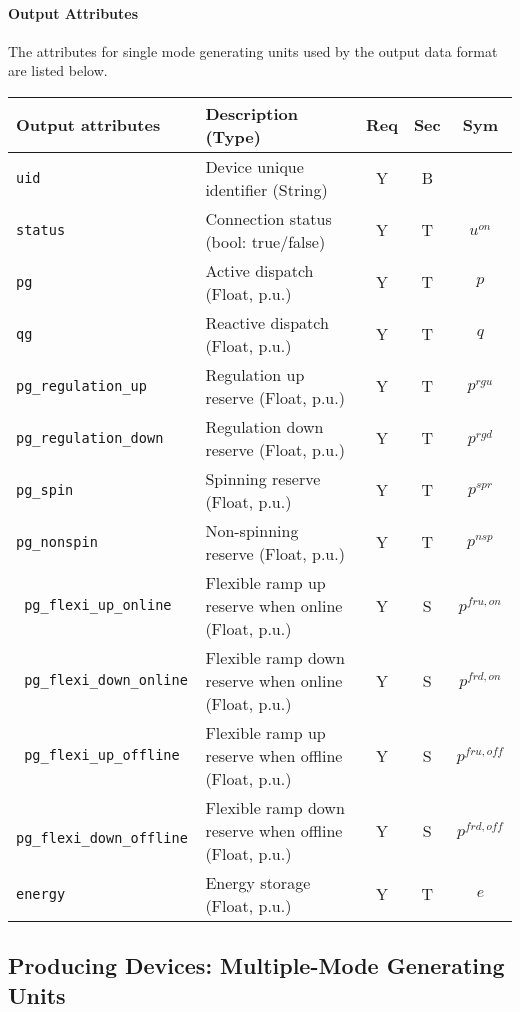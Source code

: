 \documentclass{article}
\begin{document}
\paragraph{Output Attributes} The attributes for single mode generating units used by the output data format are listed below.
\begin{center}
\small
\begin{tabular}{ l | l | c | c | c |}
Output attributes & Description (Type) & Req & Sec & Sym\\
\hline
  {\tt uid} & Device unique identifier (String) & Y & B & \\
  {\tt status}     & Connection status (bool: true/false) & Y & T & $u^{on}$ \\ 
  {\tt pg} & Active dispatch (Float, p.u.)  & Y & T & $p$ \\
  {\tt qg} & Reactive dispatch (Float, p.u.)& Y & T & $q$ \\
  {\tt pg\_regulation\_up} & Regulation up reserve (Float, p.u.) & Y & T & $p^{rgu}$\\
  {\tt pg\_regulation\_down} & Regulation down reserve (Float, p.u.) & Y & T & $p^{rgd}$\\ 
  {\tt pg\_spin} & Spinning reserve (Float, p.u.) & Y & T & $p^{spr}$\\ 
  {\tt pg\_nonspin} & Non-spinning reserve (Float, p.u.) & Y & T & $p^{nsp}$\\     
  {\tt\color{red} pg\_flexi\_up\_online}    & Flexible ramp up reserve when online (Float, p.u.) & Y & S & $p^{fru, on}$\\   
  {\tt\color{red} pg\_flexi\_down\_online}  & Flexible ramp down reserve when online (Float, p.u.) & Y & S & $p^{frd, on}$\\   
  {\tt\color{red} pg\_flexi\_up\_offline}   & Flexible ramp up reserve when offline (Float, p.u.) & Y & S & $p^{fru, off}$\\   
  {\tt\color{red} pg\_flexi\_down\_offline} & Flexible ramp down reserve when offline (Float, p.u.) & Y & S & $p^{frd, off}$\\
  {\tt energy} & Energy storage (Float, p.u.) & Y & T & $e$\\     
  \hline
\end{tabular}
\end{center}

\subsection{Producing Devices: Multiple-Mode Generating Units}
\label{nom:gen_single}
\label{nom:gen_single}
\end{document}
